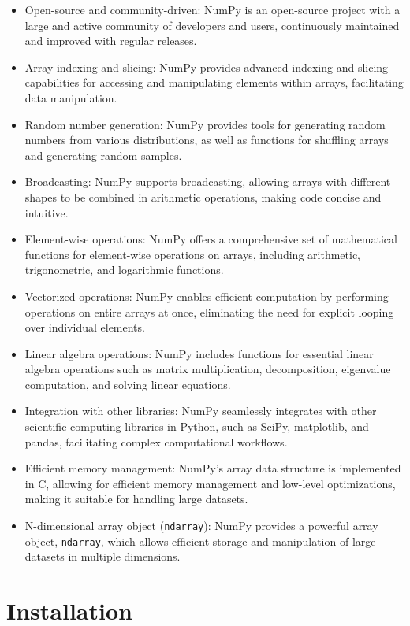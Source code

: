 \begin{itemize}
		\item Open-source and community-driven: NumPy is an open-source project with a large and active community of developers and users, continuously maintained and improved with regular releases.
		\item Array indexing and slicing: NumPy provides advanced indexing and slicing capabilities for accessing and manipulating elements within arrays, facilitating data manipulation.
		\item Random number generation: NumPy provides tools for generating random numbers from various distributions, as well as functions for shuffling arrays and generating random samples.
		\item Broadcasting: NumPy supports broadcasting, allowing arrays with different shapes to be combined in arithmetic operations, making code concise and intuitive.
		\item Element-wise operations: NumPy offers a comprehensive set of mathematical functions for element-wise operations on arrays, including arithmetic, trigonometric, and logarithmic functions.
		\item Vectorized operations: NumPy enables efficient computation by performing operations on entire arrays at once, eliminating the need for explicit looping over individual elements.
		\item Linear algebra operations: NumPy includes functions for essential linear algebra operations such as matrix multiplication, decomposition, eigenvalue computation, and solving linear equations.
		\item Integration with other libraries: NumPy seamlessly integrates with other scientific computing libraries in Python, such as SciPy, matplotlib, and pandas, facilitating complex computational workflows.
		\item Efficient memory management: NumPy's array data structure is implemented in C, allowing for efficient memory management and low-level optimizations, making it suitable for handling large datasets.
		\item N-dimensional array object (\texttt{ndarray}): NumPy provides a powerful array object, \texttt{ndarray}, which allows efficient storage and manipulation of large datasets in multiple dimensions.
\end{itemize}

\section{Installation}

